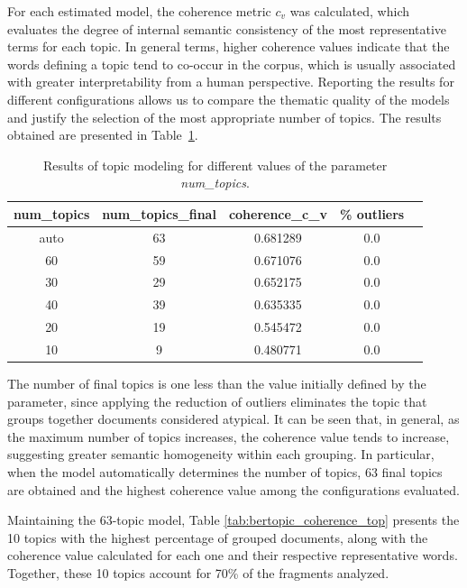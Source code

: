 \documentclass[11pt,a4paper]{article}
\begin{document}
 For each estimated model, the coherence metric 
 $c_v$ was calculated, which evaluates the
 degree of internal semantic consistency of the most representative terms for each topic. In
 general terms, higher coherence values indicate that the words defining a topic tend to co-occur
 in the corpus, which is usually associated with greater interpretability from a human perspective.
 Reporting the results for different configurations allows us to compare the thematic quality
 of the models and justify the selection of the most appropriate number of topics. The results
 obtained are presented in Table~\ref{tab:coherence_topics}.

\begin{table}[H]
	\centering
	\caption{Results of topic modeling for different values of the parameter \textit{num\_topics}.}
	\begin{tabular}{ccccc}
		\hline
		\textbf{num\_topics} & \textbf{num\_topics\_final} & \textbf{coherence\_c\_v} & \textbf{\% outliers} \\
		\hline
		auto & 63 & 0.681289 & 0.0 \\
		60   & 59 & 0.671076 & 0.0 \\
		30   & 29 & 0.652175 & 0.0 \\
		40   & 39 & 0.635335 & 0.0 \\
		20   & 19 & 0.545472 & 0.0 \\
		10   & 9  & 0.480771 & 0.0 \\
		\hline
	\end{tabular}
	\label{tab:coherence_topics}
\end{table}

The number of final topics is one less than the value initially defined by the parameter, since applying the reduction of outliers eliminates the topic that groups together documents considered atypical. It can be seen that, in general, as the maximum number of topics increases, the coherence value tends to increase, suggesting greater semantic homogeneity within each grouping. In particular, when the model automatically determines the number of topics, 63 final topics are obtained and the highest coherence value among the configurations evaluated.

		
Maintaining the 63-topic model, Table \ref{tab:bertopic_coherence_top} presents the 10 topics with the highest percentage of grouped documents, along with the coherence value calculated for each one and their respective representative words. Together, these 10 topics account for 70\% of the fragments analyzed.
		
\end{document}
